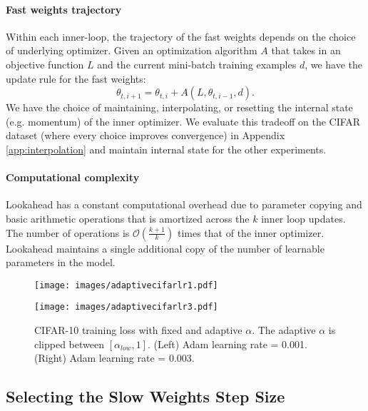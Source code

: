 \documentclass{article}
\begin{document}
\paragraph{Fast weights trajectory} Within each inner-loop, the trajectory of the fast weights depends on the choice of underlying optimizer. Given an optimization algorithm $A$ that takes in an objective function $L$ and the current mini-batch training examples $d$, we have the update rule for the fast weights:
\begin{equation}
\theta_{t, i+1} = \theta_{t, i} + A(L, \theta_{t, i-1},d).
\end{equation}
We have the choice of maintaining, interpolating, or resetting the internal state (e.g. momentum) of the inner optimizer. We evaluate this tradeoff on the CIFAR dataset (where every choice improves convergence) in Appendix \ref{app:interpolation} and maintain internal state for the other experiments. 




\paragraph{Computational complexity} Lookahead has a constant computational overhead due to parameter copying and basic arithmetic operations that is amortized across the $k$ inner loop updates. The number of operations is $\mathcal{O}(\frac{k+1}{k})$ times that of the inner optimizer. Lookahead maintains a single additional copy of the number of learnable parameters in the model.

\begin{figure}
    \centering
    \begin{minipage}{0.49 \linewidth}
    \texttt{[image: images/adaptivecifarlr1.pdf]}
    \end{minipage} \hfill
    \begin{minipage}{0.49 \linewidth}
    \texttt{[image: images/adaptivecifarlr3.pdf]}
    \end{minipage}
    \caption{CIFAR-10 training loss with fixed and adaptive $\alpha$. The adaptive $\alpha$ is clipped between $[\alpha_{low}, 1]$. (Left) Adam learning rate = 0.001.  (Right) Adam learning rate = 0.003.} 
    \label{fig:adaptivealpha}
\end{figure}

\subsection{Selecting the Slow Weights Step Size}
\end{document}
